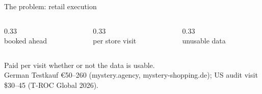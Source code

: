 \begin{frame}{The problem: retail execution}
  \centering
  \begin{columns}[T]
    \begin{column}{0.33\textwidth}\centering
      {\fontsize{28}{32}\selectfont\bfseries\color{cardano}\LeadTimeDays}\\ booked ahead
    \end{column}
    \begin{column}{0.33\textwidth}\centering
      {\fontsize{28}{32}\selectfont\bfseries\color{cardano}\CostPerVisit}\\ per store visit
    \end{column}
    \begin{column}{0.33\textwidth}\centering
      {\fontsize{28}{32}\selectfont\bfseries\color{cardano}\WasteShare}\\ unusable data
    \end{column}
  \end{columns}
  \vspace{1.5em}
  {\Large Paid per visit \alert{whether or not the data is usable.}}\\[0.5em]
  {\scriptsize German Testkauf €50--260 (mystery.agency, mystery-shopping.de); US audit visit \$30--45 (T-ROC Global 2026).} 
\end{frame}
